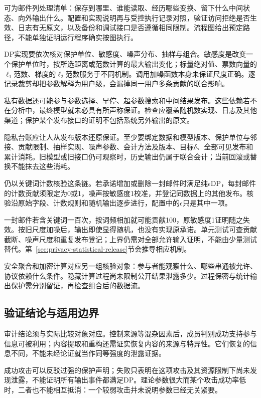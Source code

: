 可为邮件列处理清单：保存到哪里、谁能读取、经历哪些变换、留下什么中间状态、向外输出什么。配置和实现说明再与受控执行记录对照，验证访问拒绝是否生效、日志有无原文，以及备份和调试接口是否遵循相同限制。流程图给出预定路径，不能单独证明运行程序确实按图执行。

DP实现要依次核对保护单位、敏感度、噪声分布、抽样与组合。敏感度是改变一个保护单位时，按所选距离或范数计算的最大输出变化；标量绝对值、票数向量的$\ell_1$范数、梯度的$\ell_2$范数服务于不同机制。调用加噪函数本身未保证尺度正确。逐记录裁剪却把参数解释为用户级，会漏掉同一用户多条贡献的联合影响。

私有数据还可能参与参数选择、早停、超参数搜索和中间结果发布。这些依赖若不在分析中，最终模型就未必具有所声称保证。检查应覆盖随机数实现、日志及其他渠道；保护某个发布接口的证明不包括系统另外输出的原文。

隐私台账应让人从发布版本还原保证。至少要绑定数据和模型版本、保护单位与邻接、贡献限制、抽样实现、噪声参数、会计方法及版本、目标$\delta$、全部可见发布和累计消耗。旧模型或旧接口仍可观察时，历史输出仍属于联合会计；当前回滚或替换不能抹去这些消耗。

仍以关键词计数核验这条链。若承诺增加或删除一封邮件时满足纯$\epsilon$DP，每封邮件的计数贡献须限定为0或1，噪声按敏感度1校准，并登记同数据上的其他发布。核验沿原始字段、计数规则和随机输出逐步进行，配置中的$\epsilon$只是其中一项。

一封邮件若含关键词一百次，按词频相加就可能贡献100，原敏感度1证明随之失效。按旧尺度加噪后，输出即使显得随机，也没有实现原承诺。单元测试可查贡献截断、噪声尺度和重复发布登记；上界仍需对全部允许输入证明，不能由少量测试替代。第~\ref{sec:privacy-statistical-release}节会推导相应机制。

安全聚合和加密计算对应另一组核验对象：参与者能观察什么、哪些串通被允许、协议依赖什么条件。隐藏计算过程尚未限制公开结果泄露多少。过程保密与统计输出保护需分别留证，再检查组合后的数据流。

\subsection{验证结论与适用边界}
\label{sec:privacy-verification-evidence}

审计结论须与实际比较对象对应。控制来源等混杂因素后，成员判别成功支持参与信息可被利用；内容提取和重构还需证实恢复内容的来源与特异性。它们恢复的信息不同，不能未经论证就当作同等强度的泄露证据。

成功攻击可以反驳过强的保护声明；失败只表明在这项攻击及其资源限制下尚未发现泄露，不能证明所有输出事件都满足DP。理论参数很大而某个攻击成功率低时，二者也不能相互抵消：一个较弱攻击并未说明参数已经无关紧要。

